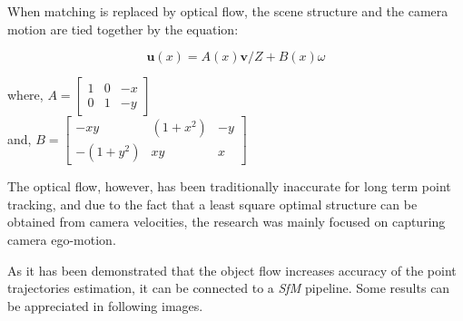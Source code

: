 When matching is replaced by optical flow, the 
scene structure and the camera motion are tied 
together by the equation:

\begin{equation}
\textbf{u}(x) = A(x)\textbf{v}/Z + B(x)\omega   
\label{eq_dfc}
\end{equation}
\begin{center}
 where, $ A =  \left[ {\begin{array}{ccc} 1 & 0 & -x\\ 0 & 1 & -y \end{array} } \right]$ \\
 and, $ B =  \left[ {\begin{array}{ccc} -xy & (1+x^2) & -y\\ -(1+y^2) & xy & x \end{array} } \right]$
\end{center}

The optical flow, however, has been traditionally 
inaccurate for long term point tracking, and due to the fact that a least square optimal structure can 
be obtained from camera velocities, the research was 
mainly focused on capturing camera ego-motion. 

As it has been demonstrated that the object flow 
increases accuracy of the point trajectories estimation, it can be connected to a {\it SfM} 
pipeline. Some results can be appreciated in following images.